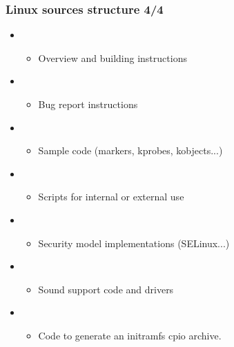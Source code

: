 \begin{frame}
  \frametitle{Linux sources structure 4/4}
  \begin{itemize}
  \item {}
    \begin{itemize}
    \item Overview and building instructions
    \end{itemize}
  \item {}
    \begin{itemize}
    \item Bug report instructions
    \end{itemize}
  \item {}
    \begin{itemize}
    \item Sample code (markers, kprobes, kobjects...)
    \end{itemize}
  \item {}
    \begin{itemize}
    \item Scripts for internal or external use
    \end{itemize}
  \item {}
    \begin{itemize}
    \item Security model implementations (SELinux...)
    \end{itemize}
  \item {}
    \begin{itemize}
    \item Sound support code and drivers
    \end{itemize}
  \item {}
    \begin{itemize}
    \item Code to generate an initramfs cpio archive.
    \end{itemize}
  \end{itemize}
\end{frame}
